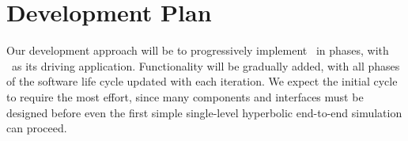 \documentclass[11pt,letterpaper]{article}
\begin{document}

\section{Development Plan} \label{s:plan}




Our development approach will be to progressively implement \cello\ in
phases, with \enzoii\ as its driving application.  Functionality will
be gradually added, with all phases of the software life cycle updated
with each iteration.  We expect the initial cycle to require the most
effort, since many components and interfaces must be designed before
even the first simple single-level hyperbolic end-to-end simulation
can proceed.
\end{document}
